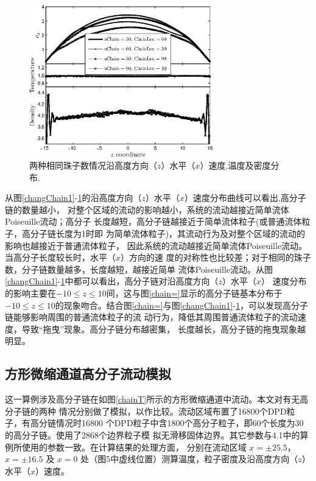 \documentclass[twoside,12pt]{article}
\begin{document}
\begin{figure}[!htb]
\centering
\includegraphics[width=8cm]{./figures/changChain3.eps}
\caption{\label{changChain3}\small 两种相同珠子数情况沿高度方向（$z$）水平（$x$）速度,温度及密度分布.}
\end{figure}


从图\ref{changChain1}-\ref{changChain3}的沿高度方向（$z$）水平（$x$）速度分布曲线可以看出,高分子链的数量越小，
对整个区域的流动的影响越小，系统的流动越接近简单流体Poiseuille流动；高分子
长度越短，高分子链越接近于简单流体粒子(或普通流体粒子，高分子链长度为1时即
为简单流体粒子)，其流动行为及对整个区域的流动的影响也越接近于普通流体粒子，
因此系统的流动越接近简单流体Poiseuille流动。当高分子长度较长时，水平（$x$）方向的速
度的对称性也比较差；对于相同的珠子数，分子链数量越多，长度越短，越接近简单
流体Poiseuille流动。从图\ref{changChain1}-\ref{changChain3}中都可以看出，高分子链对沿高度方向（$z$）水平（$x$）
速度分布的影响主要在$-10\leq z \leq 10$间，这与图\ref{chain=}显示的高分子链基本分布于$-10\leq z \leq 10$的现象吻合。结合图\ref{chain=}与图\ref{changChain1}-\ref{changChain3}，可以发现高分子链能够影响周围的普通流体粒子的流
动行为，降低其周围普通流体粒子的流动速度，导致``拖曳''现象。高分子链分布越密集，
长度越长，高分子链的拖曳现象越明显。


\subsection{ 方形微缩通道高分子流动模拟}

这一算例涉及高分子链在如图\ref{chainT}所示的方形微缩通道中流动。本文对有无高分子链的两种
情况分别做了模拟，以作比较。流动区域布置了16800个DPD粒子，有高分链情况时16800
个DPD粒子中含1800个高分子粒子，即60个长度为30的高分子链。使用了2868个边界粒子模
拟无滑移固体边界。其它参数与4.1中的算例所使用的参数一致。在计算结果的处理方面，
分别在流动区域 $x = \pm 25.5$，$x = \pm 16.5$ 及 $x = 0$ 处（图5中虚线位置）测算温度，粒子密度及沿高度方向（$z$）水平（$x$）速度。
\end{document}
